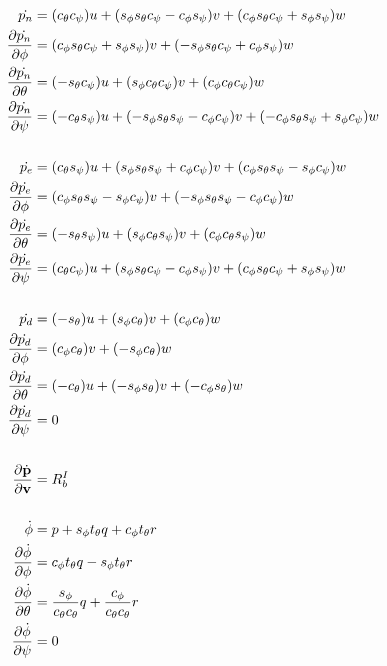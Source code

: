 \begin{align*}
  \dot{p_n} &= (\ctheta \cpsi)u + (\sphi \stheta \cpsi - \cphi \spsi)v +
    (\cphi \stheta \cpsi + \sphi \spsi)w \\
  \frac{\partial \dot{p_n}}{\partial \phi} &= (\cphi \stheta \cpsi + \sphi
    \spsi) v + (-\sphi \stheta \cpsi + \cphi \spsi) w \\
  \frac{\partial \dot{p_n}}{\partial \theta} &= (-\stheta \cpsi) u + (\sphi
    \ctheta \cpsi) v + (\cphi \ctheta \cpsi) w \\
  \frac{\partial \dot{p_n}}{\partial \psi} &= (-\ctheta \spsi) u +(-\sphi
    \stheta \spsi - \cphi \cpsi) v + (-\cphi \stheta \spsi + \sphi \cpsi)
    w \\
  \\
  \dot{p_e} &= (\ctheta \spsi)u + (\sphi \stheta \spsi + \cphi \cpsi)v +
    (\cphi \stheta \spsi - \sphi \cpsi)w \\
  \frac{\partial \dot{p_e}}{\partial \phi} &= (\cphi \stheta \spsi - \sphi
    \cpsi) v + (-\sphi \stheta \spsi - \cphi \cpsi) w \\
  \frac{\partial \dot{p_e}}{\partial \theta} &= (-\stheta \spsi)u + (\sphi
    \ctheta \spsi)v + (\cphi \ctheta \spsi)w \\
  \frac{\partial \dot{p_e}}{\partial \psi} &= (\ctheta \cpsi) u + (\sphi \stheta
    \cpsi - \cphi \spsi) v + (\cphi \stheta \cpsi + \sphi \spsi) w \\
  \\
  \dot{p_d} &= (-\stheta)u + (\sphi \ctheta)v + (\cphi \ctheta)w \\
  \frac{\partial \dot{p_d}}{\partial \phi} &= (\cphi \ctheta) v + (-\sphi
    \ctheta) w \\
  \frac{\partial \dot{p_d}}{\partial \theta} &= (-\ctheta) u + (-\sphi \stheta)
    v + (-\cphi \stheta) w \\
  \frac{\partial \dot{p_d}}{\partial \psi} &= 0 \\
  \\
  \frac{\partial \dot{\vect{p}}}{\partial {\vect{v}}} &= R_b^I \\
  \\
  \dot{\phi} &= p + \sphi \ttheta q + \cphi \ttheta r \\
  \frac{\partial \dot{\phi}}{\partial \phi} &= \cphi \ttheta q -
    \sphi \ttheta r \\
  \frac{\partial \dot{\phi}}{\partial \theta} &= \frac{\sphi}{\ctheta \ctheta} q
    + \frac{\cphi}{\ctheta \ctheta} r \\
  \frac{\partial \dot{\phi}}{\partial \psi} &= 0 \\

\end{align*}
